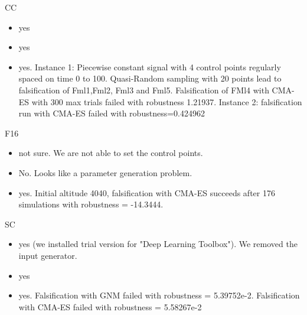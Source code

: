 	CC

	\begin{itemize}
		\item \FalStar yes
		\item \falsify yes
		\item \Breach yes. Instance 1: Piecewise constant signal with 4 control points regularly spaced on time 0 to 100. Quasi-Random sampling with 20 points lead to falsification of Fml1,Fml2, Fml3 and Fml5. Falsification of FMl4 with CMA-ES with 300 max trials failed with robustness 1.21937. Instance 2: falsification run with CMA-ES failed with robustness=0.424962
	\end{itemize}

	F16

	\begin{itemize}
		\item \FalStar not sure. We are not able to set the control points.
		\item \falsify No.  Looks like a parameter generation problem.
		\item \Breach yes. Initial altitude 4040, falsification with CMA-ES succeeds after 176 simulations with robustness = -14.3444.
	\end{itemize}

	SC

	\begin{itemize}
		\item \FalStar yes (we installed trial version for "Deep Learning Toolbox"). We removed the input generator.
		\item \falsify yes
		\item \Breach yes. Falsification with GNM failed with robustness = 5.39752e-2. Falsification with CMA-ES failed with robustness = 5.58267e-2
	\end{itemize}

